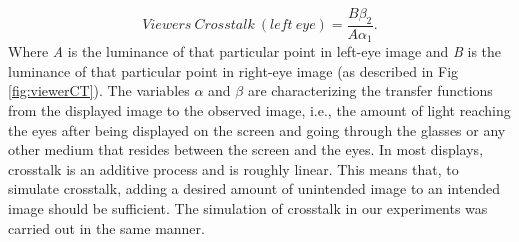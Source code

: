 \begin{equation}
Viewers\ Crosstalk\ (left\ eye) = \frac{B\beta_2}{A\alpha_1}.
\end{equation}
Where \emph{A} is the luminance of that particular point in left-eye image and \emph{B} is the luminance of that particular point in right-eye image (as described in Fig \ref{fig:viewerCT}). The variables \(\alpha\) and \(\beta\) are characterizing the transfer functions from the displayed image to the observed image, i.e., the amount of light reaching the eyes after being displayed on the screen and going through the glasses or any other medium that resides between the screen and the eyes. In most displays, crosstalk is an additive process and is roughly linear. This means that, to simulate crosstalk, adding a desired amount of unintended image to an intended image should be sufficient. The simulation of crosstalk in our experiments was carried out in the same manner.

